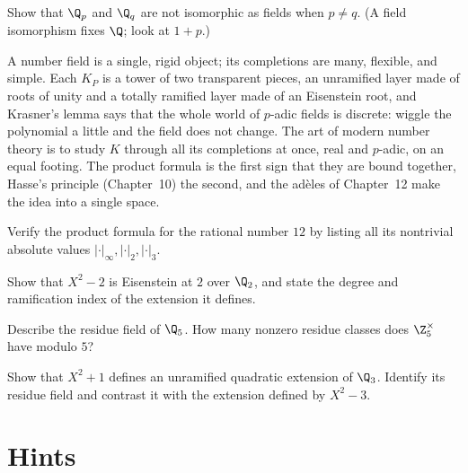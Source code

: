 \begin{exercise}[$\star\star\star$]\label{ex:QpQq}
Show that $\Q_p$ and $\Q_q$ are not isomorphic as fields when $p\ne q$. (A field isomorphism fixes $\Q$; look at $1+p$.)
\end{exercise}

\begin{beauty}
A number field is a single, rigid object; its completions are many, flexible, and simple. Each $K_P$ is a tower of two
transparent pieces, an unramified layer made of roots of unity and a totally ramified layer made of an Eisenstein root, and
Krasner's lemma says that the whole world of $p$-adic fields is discrete: wiggle the polynomial a little and the field does
not change. The art of modern number theory is to study $K$ through all its completions at once, real and $p$-adic, on an
equal footing. The product formula is the first sign that they are bound together, Hasse's principle (Chapter~10) the
second, and the ad\`eles of Chapter~12 make the idea into a single space.
\end{beauty}

\begin{exercise}[$\star$]\label{ex:v13-extra-09-1}
Verify the product formula for the rational number $12$ by listing all its nontrivial absolute values $|\cdot|_\infty,|\cdot|_2,|\cdot|_3$.
\end{exercise}

\begin{exercise}[$\star$]\label{ex:v13-extra-09-2}
Show that $X^2-2$ is Eisenstein at $2$ over $\Q_2$, and state the degree and ramification index of the extension it defines.
\end{exercise}

\begin{exercise}[$\star\star$]\label{ex:v13-extra-09-3}
Describe the residue field of $\Q_5$. How many nonzero residue classes does $\Z_5^\times$ have modulo $5$?
\end{exercise}

\begin{exercise}[$\star\star\star$]\label{ex:v13-extra-09-4}
Show that $X^2+1$ defines an unramified quadratic extension of $\Q_3$. Identify its residue field and contrast it with the extension defined by $X^2-3$.
\end{exercise}

\section{Hints}

